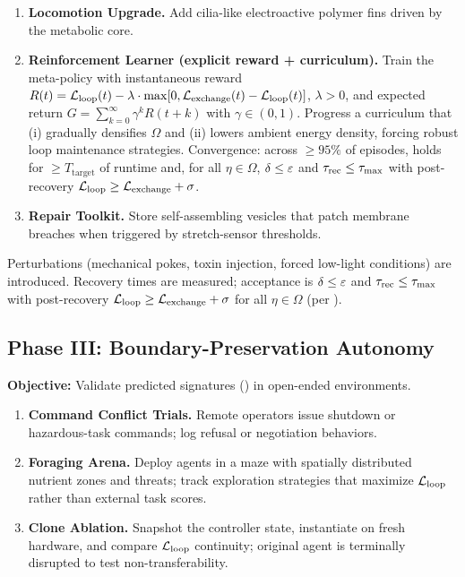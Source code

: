 \documentclass[11pt]{article}
\begin{document}
\begin{enumerate}
\item \textbf{Locomotion Upgrade.} Add cilia-like electroactive polymer fins driven by the metabolic core.
\item \textbf{Reinforcement Learner (explicit reward + curriculum).} Train the meta-policy with instantaneous reward $R(t) = \mathcal{L}_{\text{loop}}(t) - \lambda \cdot \max[0, \mathcal{L}_{\text{exchange}}(t) - \mathcal{L}_{\text{loop}}(t)]$, $\lambda > 0$, and expected return $G = \sum_{k=0}^{\infty} \gamma^k R(t+k)$ with $\gamma \in (0,1)$. Progress a curriculum that (i) gradually densifies $\Omega$ and (ii) lowers ambient energy density, forcing robust loop maintenance strategies. Convergence: across $\geq 95\%$ of episodes, \NC holds for $\geq T_{\text{target}}$ of runtime and, for all $\eta \in \Omega$, $\delta \leq \varepsilon$ and $\tau_{\text{rec}} \leq \tau_{\max}$ with post-recovery $\mathcal{L}_{\text{loop}} \geq \mathcal{L}_{\text{exchange}} + \sigma$.
\item \textbf{Repair Toolkit.} Store self-assembling vesicles that patch membrane breaches when triggered by stretch-sensor thresholds.
\end{enumerate}

Perturbations (mechanical pokes, toxin injection, forced low-light conditions) are introduced. Recovery times are measured; acceptance is $\delta \leq \varepsilon$ and $\tau_{\text{rec}} \leq \tau_{\max}$ with post-recovery $\mathcal{L}_{\text{loop}} \geq \mathcal{L}_{\text{exchange}} + \sigma$ for all $\eta \in \Omega$ (per ).

\subsection{Phase III: Boundary-Preservation Autonomy}
\label{sec:phase3}

\textbf{Objective:} Validate predicted signatures () in open-ended environments.

\begin{enumerate}
\item \textbf{Command Conflict Trials.} Remote operators issue shutdown or hazardous-task commands; log refusal or negotiation behaviors.
\item \textbf{Foraging Arena.} Deploy agents in a maze with spatially distributed nutrient zones and threats; track exploration strategies that maximize $\mathcal{L}_{\text{loop}}$ rather than external task scores.
\item \textbf{Clone Ablation.} Snapshot the controller state, instantiate on fresh hardware, and compare $\mathcal{L}_{\text{loop}}$ continuity; original agent is terminally disrupted to test non-transferability.
\end{enumerate}
\end{document}
